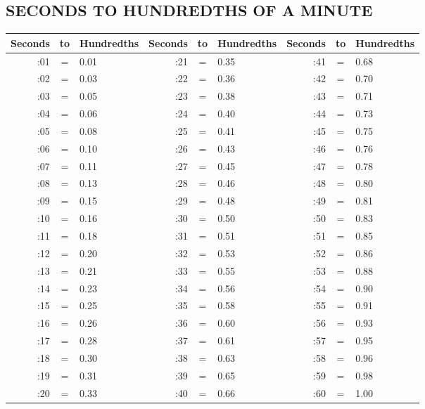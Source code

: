 \subsection{SECONDS TO HUNDREDTHS OF A MINUTE}
\begin{tabular}{ |rcl|rcl|rcl| }
  \hline
  Seconds & to & Hundredths & Seconds & to & Hundredths & Seconds & to & Hundredths \\
  \hline
  :01 & = & 0.01 & :21 & = & 0.35 & :41 & = & 0.68 \\
  :02 & = & 0.03 & :22 & = & 0.36 & :42 & = & 0.70 \\
  :03 & = & 0.05 & :23 & = & 0.38 & :43 & = & 0.71 \\
  :04 & = & 0.06 & :24 & = & 0.40 & :44 & = & 0.73 \\
  :05 & = & 0.08 & :25 & = & 0.41 & :45 & = & 0.75 \\
  \hline
  :06 & = & 0.10 & :26 & = & 0.43 & :46 & = & 0.76 \\
  :07 & = & 0.11 & :27 & = & 0.45 & :47 & = & 0.78 \\
  :08 & = & 0.13 & :28 & = & 0.46 & :48 & = & 0.80 \\
  :09 & = & 0.15 & :29 & = & 0.48 & :49 & = & 0.81 \\
  :10 & = & 0.16 & :30 & = & 0.50 & :50 & = & 0.83 \\
  \hline
  :11 & = & 0.18 & :31 & = & 0.51 & :51 & = & 0.85 \\
  :12 & = & 0.20 & :32 & = & 0.53 & :52 & = & 0.86 \\
  :13 & = & 0.21 & :33 & = & 0.55 & :53 & = & 0.88 \\
  :14 & = & 0.23 & :34 & = & 0.56 & :54 & = & 0.90 \\
  :15 & = & 0.25 & :35 & = & 0.58 & :55 & = & 0.91 \\
  \hline
  :16 & = & 0.26 & :36 & = & 0.60 & :56 & = & 0.93 \\
  :17 & = & 0.28 & :37 & = & 0.61 & :57 & = & 0.95 \\
  :18 & = & 0.30 & :38 & = & 0.63 & :58 & = & 0.96 \\
  :19 & = & 0.31 & :39 & = & 0.65 & :59 & = & 0.98 \\
  :20 & = & 0.33 & :40 & = & 0.66 & :60 & = & 1.00 \\
  \hline
\end{tabular}